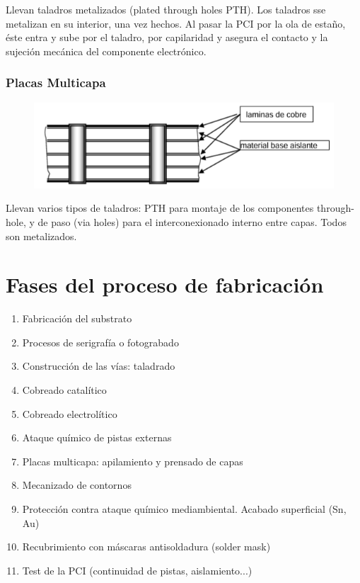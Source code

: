 Llevan taladros metalizados (plated through holes PTH). Los taladros sse metalizan en su interior, una vez hechos. Al pasar la PCI por la ola de estaño, éste entra y sube por el taladro, por capilaridad y asegura el contacto y la sujeción mecánica del componente electrónico.

\subsubsection{Placas Multicapa}

\begin{figure}[H]
    \centering
    \includegraphics[width=0.5\linewidth]{Imagenes/PCI - Placas Multicapa.png}
\end{figure}

Llevan varios tipos de taladros: PTH para montaje de los componentes through-hole, y de paso (via holes) para el interconexionado interno entre capas. Todos son metalizados.

\section{Fases del proceso de fabricación}

\begin{enumerate}
    \item Fabricación del substrato
    \item Procesos de serigrafía o fotograbado
    \item Construcción de las vías: taladrado
    \item Cobreado catalítico
    \item Cobreado electrolítico
    \item Ataque químico de pistas externas
    \item Placas multicapa: apilamiento y prensado de capas
    \item Mecanizado de contornos
    \item Protección contra ataque químico mediambiental. Acabado superficial (Sn, Au)
    \item Recubrimiento con máscaras antisoldadura (solder mask)
    \item Test de la PCI (continuidad de pistas, aislamiento...)
\end{enumerate}

